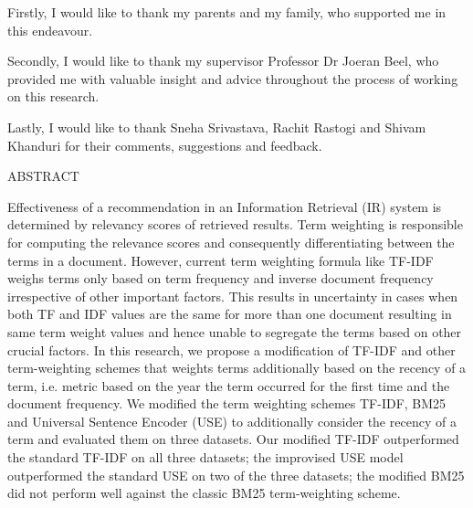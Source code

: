\documentclass[a4paper, 12pt, oneside]{report}         %
\begin{document}

\thesistitlepage                                  %

\thesisdeclarationpage                %

\thesispermissionpage                 %


\begin{thesisacknowledgments}                     %
Firstly, I would like to thank my parents and my family, who supported me in this endeavour.

Secondly, I would like to thank my supervisor Professor Dr Joeran Beel, who provided me with valuable insight and advice throughout the process of working on this research.

Lastly, I would like to thank Sneha Srivastava, Rachit Rastogi and Shivam Khanduri for their comments, suggestions and feedback.                    
\end{thesisacknowledgments}                       %

\begin{thesisabstract}                          %
ABSTRACT

Effectiveness of a recommendation in an Information Retrieval (IR) system is determined by relevancy scores of retrieved results. Term weighting is responsible for computing the relevance scores and consequently differentiating between the terms in a document. However, current term weighting formula like TF-IDF weighs terms only based on term frequency and inverse document frequency irrespective of other important factors. This results in uncertainty in cases when both TF and IDF values are the same for more than one document resulting in same term weight values and hence unable to segregate the terms based on other crucial factors. In this research, we propose a modification of TF-IDF and other term-weighting schemes that weights terms additionally based on the recency of a term, i.e. metric based on the year the term occurred for the first time and the document frequency. We modified the term weighting schemes TF-IDF, BM25 and Universal Sentence Encoder (USE) to additionally consider the recency of a term and evaluated them on three datasets. Our modified TF-IDF outperformed the standard TF-IDF on all three datasets; the improvised USE model outperformed the standard USE on two of the three datasets; the modified BM25 did not perform well against the classic BM25 term-weighting scheme.

\end{thesisabstract}
\end{document}
